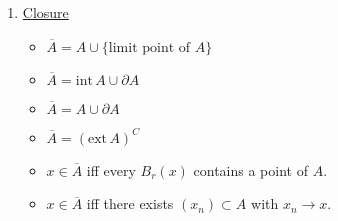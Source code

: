 \documentclass[%
 aip,
 jmp,%
 amsmath,amssymb,
 reprint,%
]{revtex4-1}
\def\interior{\mathrm{int\,}}
\def\exterior{\mathrm{ext\,}}
\newcommand{\defn}[1]{\underline{#1}}
\newcommand{\closure}[1]{\overline{#1}}
\begin{document}
\begin{enumerate}
    \item \defn{Closure}
        \begin{itemize}
          \item $\closure{A} = A \cup \{\textrm{limit point of } A\}$
          \item $\closure{A} = \interior A \cup \partial A$
          \item $\closure{A} = A \cup \partial A$
          \item $\closure{A} = (\exterior A)^C$
          \item $x\in\closure{A}$ iff every $B_r(x)$ contains a point of $A$.
          \item $x\in\closure{A}$ iff there exists $(x_n)\subset A$ with $x_n\to x$.
        \end{itemize}
\end{enumerate}
\end{document}
